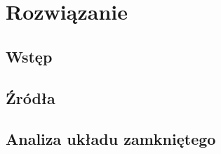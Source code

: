 \chapter{Rozwiązanie}
\label{cha:rozw}

\section{Wst\k{e}p}
\label{sec:rozw_wstep}




\section{Źródła}
\label{sec:zrodla}



\section{Analiza układu zamkniętego}
\label{sec:zamkniety}
